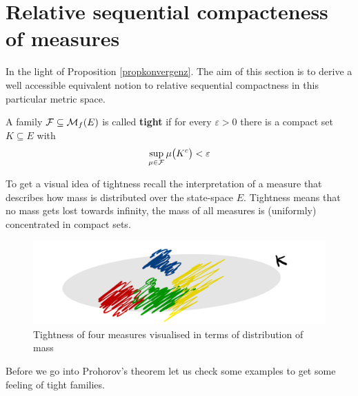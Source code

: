 \section[Relative sequential compacteness of measures]{Relative sequential compacteness of measures}\label{sec:tight}




In the light of Proposition \ref{propkonvergenz}. The aim of this section is to derive a well accessible equivalent notion to relative sequential compactness in this particular metric space. 

\begin{ldef}
\begin{deff}\label{def_tight}
	A family $\mathcal{F} \subseteq \mathcal{M}_f(E)$ is called \textbf{tight}  if for every $\varepsilon>0$ there is a compact set $K \subseteq E$ with $$ \sup_{\mu \in \mathcal{F}} \mu \big(K^c\big) < \varepsilon$$
\end{deff}
\end{ldef}
To get a visual idea of tightness recall the interpretation of a measure that describes how mass is distributed over the state-space $E$. Tightness means that no mass gets lost towards infinity, the mass of all measures is (uniformly) concentrated in compact sets. 
\begin{figure}[h]
			\begin{center}
				\includegraphics[scale=0.07]{tight.jpeg}
			\end{center}
			\vspace{-7mm}
			\caption*{Tightness of four measures visualised in terms of distribution of mass}
			\end{figure}
			Before we go into Prohorov's theorem let us check some examples to get some feeling of tight families.


